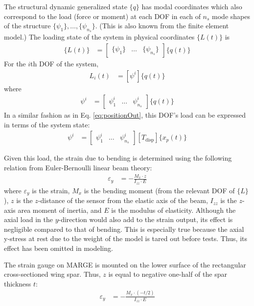 The structural dynamic generalized state $\{q\}$ has modal coordinates which also correspond to the load (force or moment) at each DOF in each of $n_s$ mode shapes of the structure $\{\psi_1\}, \dots, \{\psi_{n_s}\}$. (This is also known from the finite element model.) The loading state of the system in physical coordinates $\{L(t)\}$ is
\begin{align}
	\{L(t)\} &= \begin{bmatrix} \{\psi_1\} & \dots & \{\psi_{n_s}\} \end{bmatrix} \{q(t)\}
\end{align}
For the $i$th DOF of the system,
\begin{align}
	L_i(t) &= [\psi^i] \{q(t)\}
\end{align}
where
\begin{align}
	\psi^i &= \begin{bmatrix} \psi_1^i & \dots & \psi_{n_s}^i \end{bmatrix} \{q(t)\}
\end{align}
In a similar fashion as in Eq. \ref{eq:positionOut}, this DOF's load can be expressed in terms of the system state:
\begin{align}
	\label{eq:loadOut}
	\psi^i &= \begin{bmatrix} \psi_1^i & \dots & \psi_{n_s}^i \end{bmatrix} [T_\text{disp}] \{x_p(t)\}
\end{align}

Given this load, the strain due to bending is determined using the following relation from Euler-Bernoulli linear beam theory:
\begin{align}
	\label{eq:beamTheory}
	\varepsilon_{y} &= -\frac{M_x \cdot z}{I_{zz} \cdot E}
\end{align}
where $\varepsilon_y$ is the strain, $M_x$ is the bending moment (from the relevant DOF of $\{L\}$), $z$ is the $z$-distance of the sensor from the elastic axis of the beam, $I_{zz}$ is the $z$-axis area moment of inertia, and $E$ is the modulus of elasticity. Although the axial load in the $y$-direction would also add to the strain output, its effect is negligible compared to that of bending. This is especially true because the axial y-stress at rest due to the weight of the model is tared out before tests. Thus, its effect has been omitted in modeling.

The strain gauge on MARGE is mounted on the lower surface of the rectangular cross-sectioned wing spar.  Thus, $z$ is equal to negative one-half of the spar thickness $t$:
\begin{align}
	\varepsilon_{y} &= -\frac{M_x \cdot (-t/2)}{I_{zz} \cdot E}
\end{align}

